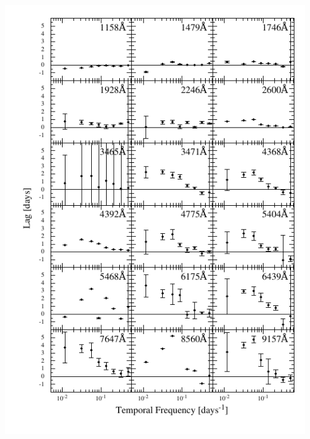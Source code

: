 \documentclass[11pt,letterpaper]{article}
\begin{document}
\includegraphics{../img/timelag_atlas_err0.pdf}
\end{document}
